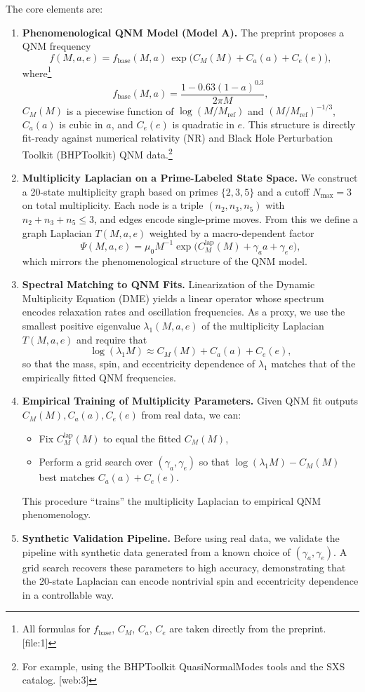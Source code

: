 \documentclass[11pt]{article}
\begin{document}
The core elements are:
\begin{enumerate}
  \item \textbf{Phenomenological QNM Model (Model A).} The preprint proposes a QNM frequency
  \[
    f(M,a,e) = f_{\text{base}}(M,a)\,\exp\!\big(C_M(M) + C_a(a) + C_e(e)\big),
  \]
  where\footnote{All formulas for $f_{\text{base}}$, $C_M$, $C_a$, $C_e$ are taken directly from the preprint. [file:1]}
  \[
    f_{\text{base}}(M,a) = \frac{1 - 0.63(1-a)^{0.3}}{2\pi M},
  \]
  $C_M(M)$ is a piecewise function of $\log(M/M_{\text{ref}})$ and $(M/M_{\text{ref}})^{-1/3}$, $C_a(a)$ is cubic in $a$, and $C_e(e)$ is quadratic in $e$. This structure is directly fit-ready against numerical relativity (NR) and Black Hole Perturbation Toolkit (BHPToolkit) QNM data.\footnote{For example, using the BHPToolkit QuasiNormalModes tools and the SXS catalog. [web:3]}

  \item \textbf{Multiplicity Laplacian on a Prime-Labeled State Space.} We construct a 20-state multiplicity graph based on primes $\{2,3,5\}$ and a cutoff $N_{\max}=3$ on total multiplicity. Each node is a triple $(n_2,n_3,n_5)$ with $n_2+n_3+n_5\le 3$, and edges encode single-prime moves. From this we define a graph Laplacian $T(M,a,e)$ weighted by a macro-dependent factor
  \[
    \Psi(M,a,e) = \mu_0 M^{-1} \exp\!\big(C_M^{\text{lap}}(M) + \gamma_a a + \gamma_e e\big),
  \]
  which mirrors the phenomenological structure of the QNM model.

  \item \textbf{Spectral Matching to QNM Fits.} Linearization of the Dynamic Multiplicity Equation (DME) yields a linear operator whose spectrum encodes relaxation rates and oscillation frequencies. As a proxy, we use the smallest positive eigenvalue $\lambda_1(M,a,e)$ of the multiplicity Laplacian $T(M,a,e)$ and require that
  \[
    \log(\lambda_1 M) \approx C_M(M) + C_a(a) + C_e(e),
  \]
  so that the mass, spin, and eccentricity dependence of $\lambda_1$ matches that of the empirically fitted QNM frequencies.

  \item \textbf{Empirical Training of Multiplicity Parameters.} Given QNM fit outputs $C_M(M), C_a(a), C_e(e)$ from real data, we can:
  \begin{itemize}
    \item Fix $C_M^{\text{lap}}(M)$ to equal the fitted $C_M(M)$,
    \item Perform a grid search over $(\gamma_a,\gamma_e)$ so that $\log(\lambda_1 M) - C_M(M)$ best matches $C_a(a)+C_e(e)$.
  \end{itemize}
  This procedure ``trains'' the multiplicity Laplacian to empirical QNM phenomenology.

  \item \textbf{Synthetic Validation Pipeline.} Before using real data, we validate the pipeline with synthetic data generated from a known choice of $(\gamma_a,\gamma_e)$. A grid search recovers these parameters to high accuracy, demonstrating that the 20-state Laplacian can encode nontrivial spin and eccentricity dependence in a controllable way.
\end{enumerate}
\end{document}
